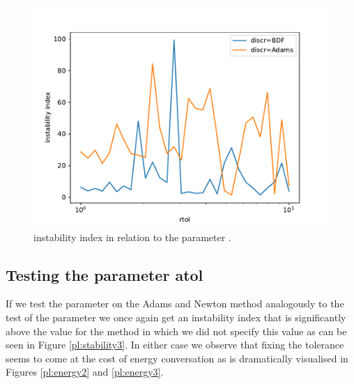 \documentclass{scrartcl}
\begin{document}
\begin{figure}[h]
\centering
\begin{minipage}[b]{0.45\textwidth}
\centering
\includegraphics[width=\textwidth]{../Plots/Task4/Figure_304}
\caption{instability index in relation to the parameter .}
\label{pl:stability2}
\end{minipage}
\end{figure}

\subsection*{Testing the parameter atol}

If we test the  parameter on the Adams and Newton method analogously to the test of the  parameter we once again get an instability index that is significantly above the value for the method in which we did not specify this value as can be seen in Figure \ref{pl:stability3}. In either case we observe that fixing the tolerance seems to come at the cost of energy conversation as is dramatically visualised in Figures \ref{pl:energy2} and \ref{pl:energy3}.
\end{document}
